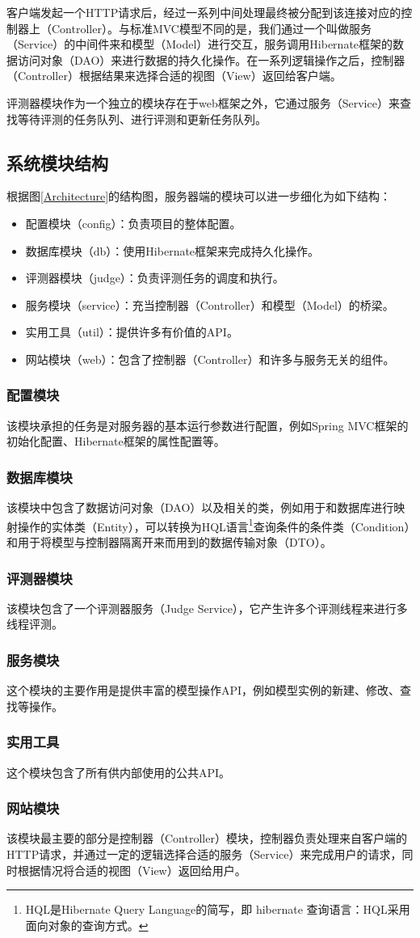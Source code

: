 客户端发起一个HTTP请求后，经过一系列中间处理最终被分配到该连接对应的控制器上（Controller）。与标准MVC模型不同的是，我们通过一个叫做服务（Service）的中间件来和模型（Model）进行交互，服务调用Hibernate框架的数据访问对象（DAO）来进行数据的持久化操作。在一系列逻辑操作之后，控制器（Controller）根据结果来选择合适的视图（View）返回给客户端。

评测器模块作为一个独立的模块存在于web框架之外，它通过服务（Service）来查找等待评测的任务队列、进行评测和更新任务队列。

\subsection{系统模块结构}
根据图\ref{Architecture}的结构图，服务器端的模块可以进一步细化为如下结构：
\begin{itemize}
	\item 配置模块（config）：负责项目的整体配置。
	\item 数据库模块（db）：使用Hibernate框架来完成持久化操作。
	\item 评测器模块（judge）：负责评测任务的调度和执行。
	\item 服务模块（service）：充当控制器（Controller）和模型（Model）的桥梁。
	\item 实用工具（util）：提供许多有价值的API。
	\item 网站模块（web）：包含了控制器（Controller）和许多与服务无关的组件。
\end{itemize}

\subsubsection{配置模块}
该模块承担的任务是对服务器的基本运行参数进行配置，例如Spring MVC框架的初始化配置、Hibernate框架的属性配置等。

\subsubsection{数据库模块}
该模块中包含了数据访问对象（DAO）以及相关的类，例如用于和数据库进行映射操作的实体类（Entity），可以转换为HQL语言\footnote{HQL是Hibernate Query Language的简写，即 hibernate 查询语言：HQL采用面向对象的查询方式。}查询条件的条件类（Condition）和用于将模型与控制器隔离开来而用到的数据传输对象（DTO）。

\subsubsection{评测器模块}
该模块包含了一个评测器服务（Judge Service），它产生许多个评测线程来进行多线程评测。

\subsubsection{服务模块}
这个模块的主要作用是提供丰富的模型操作API，例如模型实例的新建、修改、查找等操作。

\subsubsection{实用工具}
这个模块包含了所有供内部使用的公共API。

\subsubsection{网站模块}
该模块最主要的部分是控制器（Controller）模块，控制器负责处理来自客户端的HTTP请求，并通过一定的逻辑选择合适的服务（Service）来完成用户的请求，同时根据情况将合适的视图（View）返回给用户。